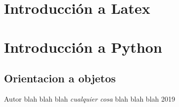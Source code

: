\documentclass{book}
\begin{document}
\chapter{Introducción a Latex}
\chapter{Introducción a Python}
\section*{Orientacion a objetos}

\begin{thebibliography}{9}
	Autor blah blah blah
	\textit{cualquier cosa}
	blah blah blah 2019
\end{thebibliography}
	
\end{document}
